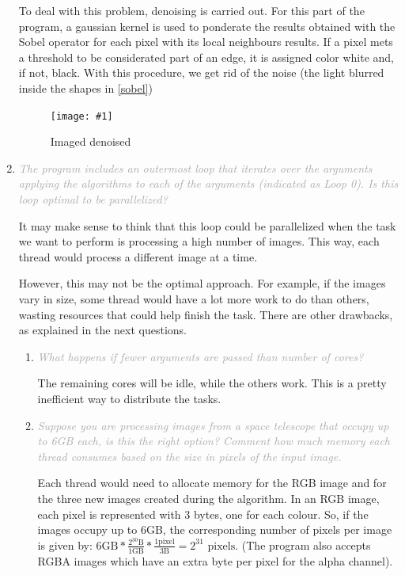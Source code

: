 \documentclass{article}
\newcommand{\myFigure}[4]{%
    \begin{figure}[!ht]
        \texttt{[image: \#1]}
        \centering
        \caption{#2}
        \label{#3}
    \end{figure}
}
\newcommand{\greyItem}[1]{\item\emph{\textcolor{darkgray}{#1}}}
\begin{document}
\begin{enumerate}[label=5.\arabic*,leftmargin=*]
To deal with this problem, denoising is carried out. For this part of the program, a gaussian kernel is used to ponderate the results obtained with the Sobel operator for each pixel with its local neighbours results. If a pixel mets a threshold to be considerated part of an edge, it is assigned color white and, if not, black. With this procedure, we get rid of the noise (the light blurred inside the shapes in \ref{sobel}) 

\myFigure{../material/img/im4_grad_denoised}{Imaged denoised}{denoised}{0.35}


\newpage
\greyItem{The program includes an outermost loop that iterates over the arguments applying the algorithms to each of the arguments (indicated as Loop 0). Is this loop optimal to be parallelized?}

It may make sense to think that this loop could be parallelized when the task we want to perform is processing a high number of images. This way, each thread would process a different image at a time.

However, this may not be the optimal approach. For example, if the images vary in size, some thread would have a lot more work to do than others, wasting resources that could help finish the task. There are other drawbacks, as explained in the next questions.

    \begin{enumerate}
        \greyItem{What happens if fewer arguments are passed than number of cores?}
            
        The remaining cores will be idle, while the others work. This is a pretty inefficient way to distribute the tasks.

        \greyItem{Suppose you are processing images from a space telescope that occupy up to 6GB each, is this the right option? Comment how much memory each thread consumes based on the size in pixels of the input image.}

        Each thread would need to allocate memory for the RGB image and for the three new images created during the algorithm. In an RGB image, each pixel is represented with 3 bytes, one for each colour. So, if the images occupy up to 6GB, the corresponding number of pixels per image is given by: ${6\text{GB}}*\frac{2^{30}\text{B}}{1\text{GB}}*\frac{1\text{pixel}}{3\text{B}}=2^{31}\text{ pixels}$. (The program also accepts RGBA images which have an extra byte per pixel for the alpha channel).
        

\end{enumerate}
\end{enumerate}
\end{document}
